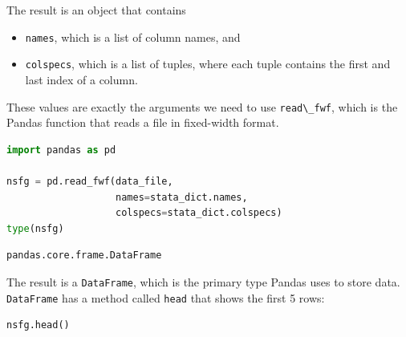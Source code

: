 The result is an object that contains

\begin{itemize}
\item
  \passthrough{\lstinline!names!}, which is a list of column names, and
\item
  \passthrough{\lstinline!colspecs!}, which is a list of tuples, where
  each tuple contains the first and last index of a column.
\end{itemize}

These values are exactly the arguments we need to use
\passthrough{\lstinline!read\_fwf!}, which is the Pandas function that
reads a file in fixed-width format.

\begin{lstlisting}[language=Python,style=source]
import pandas as pd

nsfg = pd.read_fwf(data_file, 
                   names=stata_dict.names, 
                   colspecs=stata_dict.colspecs)
type(nsfg)
\end{lstlisting}

\begin{lstlisting}[style=output]
pandas.core.frame.DataFrame
\end{lstlisting}

The result is a \passthrough{\lstinline!DataFrame!}, which is the
primary type Pandas uses to store data.
\passthrough{\lstinline!DataFrame!} has a method called
\passthrough{\lstinline!head!} that shows the first 5 rows:

\begin{lstlisting}[language=Python,style=source]
nsfg.head()
\end{lstlisting}

